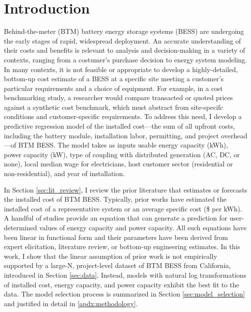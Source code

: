 \documentclass[preprint,12pt,authoryear]{elsarticle}
\begin{document}

\section{Introduction}\label{sec:intro}

Behind-the-meter (BTM) battery energy storage systems (BESS) are undergoing the early stages of rapid, widespread deployment. An accurate understanding of their costs and benefits is relevant to analysis and decision-making in a variety of contexts, ranging from a costumer's purchase decision to energy system modeling. In many contexts, it is not feasible or appropriate to develop a highly-detailed, bottom-up cost estimate of a BESS at a specific site meeting a customer's particular requirements and a choice of equipment. For example, in a cost benchmarking study, a researcher would compare transacted or quoted prices against a synthetic cost benchmark, which must abstract from site-specifc conditions and customer-specific requirements. To address this need, I develop a predictive regression model of the installed cost---the sum of all upfront costs, including the battery module, installation labor, permitting, and project overhead---of BTM BESS. The model takes as inputs usable energy capacity (kWh), power capacity (kW), type of coupling with distributed generation (AC, DC, or none), local median wage for electricians, host customer sector (residential or non-residential), and year of installation. 

In Section \ref{sec:lit_review}, I review the prior literature that estimates or forecasts the installed cost of BTM BESS. Typically, prior works have estimated the installed cost of a representative system or an average specific cost (\$ per kWh). A handful of studies provide an equation that can generate a prediction for user-determined values of energy capacity and power capacity. All such equations have been linear in functional form and their parameters have been derived from expert elicitation, literature review, or bottom-up engineering estimates. In this work, I show that the linear assumption of prior work is not empirically supported by a large-N, project-level dataset of BTM BESS from California, introduced in Section \ref{sec:data}. Instead, models with natural log transformations of installed cost, energy capacity, and power capacity exhibit the best fit to the data. The model selection process is summarized in Section \ref{sec:model_selection} and justified in detail in \ref{apdx:methodology}.
\end{document}
